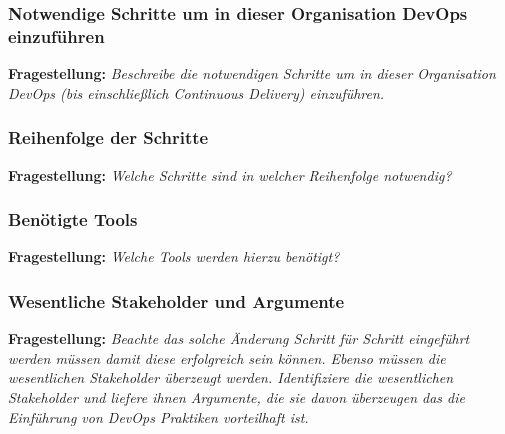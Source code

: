\subsubsection{Notwendige Schritte um in dieser Organisation DevOps einzuführen}
\textbf{Fragestellung:} \textit{Beschreibe die notwendigen Schritte um in dieser Organisation DevOps (bis einschließlich
Continuous Delivery) einzuführen.}



\subsubsection{Reihenfolge der Schritte}

\textbf{Fragestellung:} \textit{Welche Schritte sind in welcher Reihenfolge notwendig?}



\subsubsection{Benötigte Tools}

\textbf{Fragestellung:} \textit{Welche Tools werden hierzu benötigt?}

\subsubsection{Wesentliche Stakeholder und Argumente}

\textbf{Fragestellung:} \textit{Beachte das solche Änderung Schritt für Schritt eingeführt werden müssen damit diese
erfolgreich sein können. Ebenso müssen die wesentlichen Stakeholder überzeugt werden.
Identifiziere die wesentlichen Stakeholder und liefere ihnen Argumente, die sie davon
überzeugen das die Einführung von DevOps Praktiken vorteilhaft ist.}


